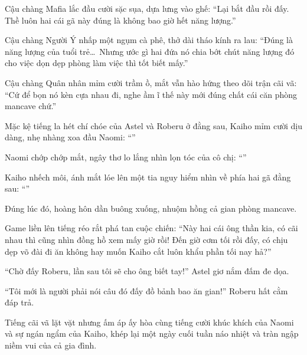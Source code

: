 \documentclass[../main.tex]{subfiles}
\begin{document}
Cậu chàng Mafia lắc đầu cười sặc sụa, dựa lưng vào ghế: ``Lại bắt đầu rồi đấy. Thề luôn hai cái gã này đúng là không bao giờ hết năng lượng.''

Cậu chàng Người Ý nhấp một ngụm cà phê, thở dài tháo kính ra lau: ``Đúng là năng lượng của tuổi trẻ\dots\ Nhưng ước gì hai đứa nó chia bớt chút năng lượng đó cho việc dọn dẹp phòng làm việc thì tốt biết mấy.''

Cậu chàng Quân nhân mỉm cười trầm ồ, mắt vẫn hào hứng theo dõi trận cãi vã: ``Cứ để bọn nó kèn cựa nhau đi, nghe ầm ĩ thế này mới đúng chất cái căn phòng mancave chứ.''

Mặc kệ tiếng la hét chí chóe của Astel và Roberu ở đằng sau, Kaiho mỉm cười dịu dàng, nhẹ nhàng xoa đầu Naomi: ``''

Naomi chớp chớp mắt, ngây thơ lo lắng nhìn lọn tóc của cô chị: ``''

Kaiho nhếch môi, ánh mắt lóe lên một tia nguy hiểm nhìn về phía hai gã đằng sau: ``''

Đúng lúc đó, hoàng hôn dần buông xuống, nhuộm hồng cả gian phòng mancave.

Game liền lên tiếng réo rắt phá tan cuộc chiến: ``Này hai cái ông thần kia, có cãi nhau thì cũng nhìn đồng hồ xem mấy giờ rồi! Đến giờ cơm tối rồi đấy, có chịu dẹp võ đài đi ăn không hay muốn Kaiho cắt luôn khẩu phần tối nay hả?''

``Chờ đấy Roberu, lần sau tôi sẽ cho ông biết tay!'' Astel giơ nắm đấm đe dọa.

``Tôi mới là người phải nói câu đó đấy đồ bảnh bao ăn gian!'' Roberu hất cằm đáp trả.

Tiếng cãi vã lặt vặt nhưng ấm áp ấy hòa cùng tiếng cười khúc khích của Naomi và sự ngán ngẩm của Kaiho, khép lại một ngày cuối tuần náo nhiệt và tràn ngập niềm vui của cả gia đình.
\end{document}
